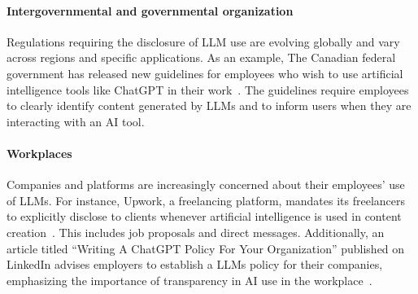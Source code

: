 \paragraph{Intergovernmental and governmental organization}
Regulations requiring the disclosure of LLM use are evolving globally and vary across regions and specific applications. As an example,
The Canadian federal government has released new guidelines for employees who wish to use artificial intelligence tools like ChatGPT in their work~\cite{Canada2024GenerativeAI}.
The guidelines require employees to clearly identify content generated by LLMs and to inform users when they are interacting with an AI tool. 


\paragraph{Workplaces}
Companies and platforms are increasingly concerned about their employees' use of LLMs. 
For instance, Upwork, a freelancing platform, mandates its freelancers to explicitly disclose to clients whenever artificial intelligence is used in content creation~\cite{Upwork2024ChatGPTStance}. This includes job proposals and direct messages.
Additionally, an article titled ``Writing A ChatGPT Policy For Your Organization'' published on LinkedIn advises employers to establish a LLMs policy for their companies, emphasizing the importance of transparency in AI use in the workplace~\cite{LinkedIn2024ChatGPTPolicy}.

